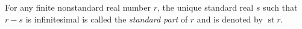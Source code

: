 For any finite nonstandard real number $r$, the unique standard real $s$ such that $r - s$ is infinitesimal is called the \emph{standard part} of $r$ and is denoted by $\operatorname{st} r$.
